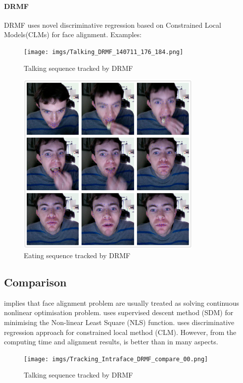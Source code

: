 \paragraph{DRMF}
DRMF uses novel discriminative regression based on Constrained Local Models(CLMs) for face alignment.
\newline
Examples:
\begin{figure}[ht!]
\centering
\texttt{[image: imgs/Talking\_DRMF\_140711\_176\_184.png]}
\caption{Talking sequence tracked by DRMF}
\end{figure}

\begin{figure}[ht!]
\centering
\includegraphics[width=90mm]{imgs/Tracking_DRMF_eating.png}
\caption{Eating sequence tracked by DRMF}
\end{figure}


\subsection{Comparison}
\cite{xiong2013supervised} implies that face alignment problem are usually treated as  solving continuous nonlinear optimisation problem. \cite{xiong2013supervised} uses supervised descent method (SDM) for minimising the  Non-linear Least Square (NLS) function. \cite{asthana2013robust} uses discriminative regression approach for constrained local method (CLM). However, from the computing time and alignment results, \cite{xiong2013supervised} is better than \cite{asthana2013robust} in many aspects.
\newline

\begin{figure}[ht!]
\centering
\texttt{[image: imgs/Tracking\_Intraface\_DRMF\_compare\_00.png]}
\caption{Talking sequence tracked by DRMF}
\end{figure}

